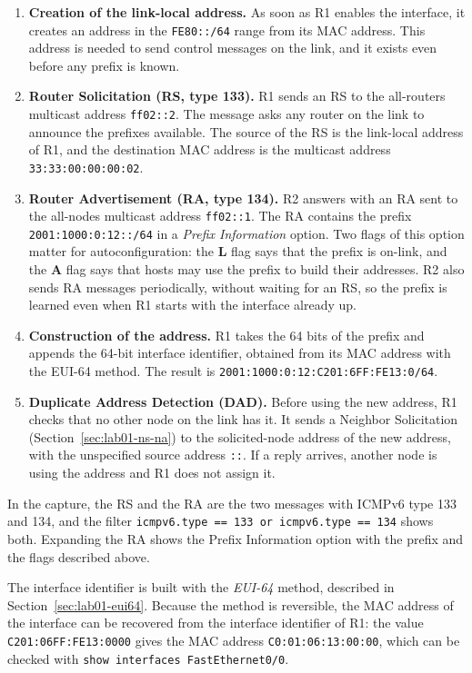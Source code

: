 \begin{enumerate}
\item \textbf{Creation of the link-local address.} As soon as R1 enables the interface, it creates an address in the \texttt{FE80::/64} range from its MAC address. This address is needed to send control messages on the link, and it exists even before any prefix is known.
\item \textbf{Router Solicitation (RS, type 133).} R1 sends an RS to the all-routers multicast address \texttt{ff02::2}. The message asks any router on the link to announce the prefixes available. The source of the RS is the link-local address of R1, and the destination MAC address is the multicast address \texttt{33:33:00:00:00:02}.
\item \textbf{Router Advertisement (RA, type 134).} R2 answers with an RA sent to the all-nodes multicast address \texttt{ff02::1}. The RA contains the prefix \texttt{2001:1000:0:12::/64} in a \emph{Prefix Information} option. Two flags of this option matter for autoconfiguration: the \textbf{L} flag says that the prefix is on-link, and the \textbf{A} flag says that hosts may use the prefix to build their addresses. R2 also sends RA messages periodically, without waiting for an RS, so the prefix is learned even when R1 starts with the interface already up.
\item \textbf{Construction of the address.} R1 takes the 64 bits of the prefix and appends the 64-bit interface identifier, obtained from its MAC address with the EUI-64 method. The result is \texttt{2001:1000:0:12:C201:6FF:FE13:0/64}.
\item \textbf{Duplicate Address Detection (DAD).} Before using the new address, R1 checks that no other node on the link has it. It sends a Neighbor Solicitation (Section~\ref{sec:lab01-ns-na}) to the solicited-node address of the new address, with the unspecified source address \texttt{::}. If a reply arrives, another node is using the address and R1 does not assign it.
\end{enumerate}

In the capture, the RS and the RA are the two messages with ICMPv6 type 133 and 134, and the filter \texttt{icmpv6.type == 133 or icmpv6.type == 134} shows both. Expanding the RA shows the Prefix Information option with the prefix and the flags described above.

The interface identifier is built with the \emph{EUI-64} method, described in Section~\ref{sec:lab01-eui64}. Because the method is reversible, the MAC address of the interface can be recovered from the interface identifier of R1: the value \texttt{C201:06FF:FE13:0000} gives the MAC address \texttt{C0:01:06:13:00:00}, which can be checked with \texttt{show interfaces FastEthernet0/0}.


